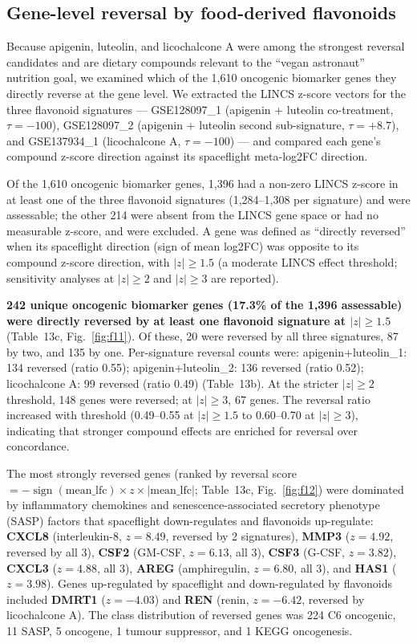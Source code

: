 \documentclass[pdflatex,sn-nature]{sn-jnl}
\begin{document}
\subsection{Gene-level reversal by food-derived flavonoids}

Because apigenin, luteolin, and licochalcone A were among the strongest reversal
candidates and are dietary compounds relevant to the ``vegan astronaut'' nutrition
goal, we examined which of the 1{,}610 oncogenic biomarker genes they directly
reverse at the gene level. We extracted the LINCS z-score vectors for the three
flavonoid signatures --- GSE128097\_1 (apigenin + luteolin co-treatment, \(\tau =
-100\)), GSE128097\_2 (apigenin + luteolin second sub-signature, \(\tau = +8.7\)),
and GSE137934\_1 (licochalcone A, \(\tau = -100\)) --- and compared each gene's
compound z-score direction against its spaceflight meta-log2FC direction.

Of the 1{,}610 oncogenic biomarker genes, 1{,}396 had a non-zero LINCS z-score in at
least one of the three flavonoid signatures (1{,}284--1{,}308 per signature) and
were assessable; the other 214 were absent from the LINCS gene space or had no
measurable z-score, and were excluded. A gene was defined as ``directly reversed'' when its spaceflight
direction (sign of mean log2FC) was opposite to its compound z-score direction,
with \(|z| \geq 1.5\) (a moderate LINCS effect threshold; sensitivity analyses at
\(|z| \geq 2\) and \(|z| \geq 3\) are reported).

\textbf{242 unique oncogenic biomarker genes (17.3\% of the 1{,}396 assessable)
were directly reversed by at least one flavonoid signature at \(|z| \geq 1.5\)}
(Table~13c, Fig.~\ref{fig:f11}). Of these, 20 were reversed by all three
signatures, 87 by two, and 135 by one. Per-signature reversal counts were:
apigenin+luteolin\_1: 134 reversed (ratio 0.55); apigenin+luteolin\_2: 136 reversed
(ratio 0.52); licochalcone A: 99 reversed (ratio 0.49) (Table~13b). At the stricter
\(|z| \geq 2\) threshold, 148 genes were reversed; at \(|z| \geq 3\), 67 genes. The
reversal ratio increased with threshold (0.49--0.55 at \(|z| \geq 1.5\) to
0.60--0.70 at \(|z| \geq 3\)), indicating that stronger compound effects are
enriched for reversal over concordance.

The most strongly reversed genes (ranked by reversal score \(= -\operatorname{sign}
(\text{mean\_lfc}) \times z \times |\text{mean\_lfc}|\); Table~13c,
Fig.~\ref{fig:f12}) were dominated by inflammatory chemokines and
senescence-associated secretory phenotype (SASP) factors that spaceflight
down-regulates and flavonoids up-regulate: \textbf{CXCL8} (interleukin-8, \(z =
8.49\), reversed by 2 signatures), \textbf{MMP3} (\(z = 4.92\), reversed by all 3),
\textbf{CSF2} (GM-CSF, \(z = 6.13\), all 3), \textbf{CSF3} (G-CSF, \(z = 3.82\)),
\textbf{CXCL3} (\(z = 4.88\), all 3), \textbf{AREG} (amphiregulin, \(z = 6.80\), all
3), and \textbf{HAS1} (\(z = 3.98\)). Genes up-regulated by spaceflight and
down-regulated by flavonoids included \textbf{DMRT1} (\(z = -4.03\)) and
\textbf{REN} (renin, \(z = -6.42\), reversed by licochalcone A). The class
distribution of reversed genes was 224 C6 oncogenic, 11 SASP, 5 oncogene, 1
tumour suppressor, and 1 KEGG oncogenesis.
\end{document}
